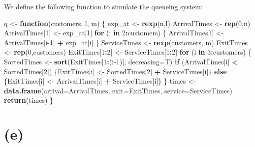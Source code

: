 \documentclass[]{article}
\newenvironment{Shaded}{\begin{snugshade}}{\end{snugshade}}
\newcommand{\ControlFlowTok}[1]{\textcolor[rgb]{0.13,0.29,0.53}{\textbf{#1}}}
\newcommand{\DataTypeTok}[1]{\textcolor[rgb]{0.13,0.29,0.53}{#1}}
\newcommand{\DecValTok}[1]{\textcolor[rgb]{0.00,0.00,0.81}{#1}}
\newcommand{\KeywordTok}[1]{\textcolor[rgb]{0.13,0.29,0.53}{\textbf{#1}}}
\newcommand{\NormalTok}[1]{#1}
\newcommand{\OperatorTok}[1]{\textcolor[rgb]{0.81,0.36,0.00}{\textbf{#1}}}
\newcommand{\StringTok}[1]{\textcolor[rgb]{0.31,0.60,0.02}{#1}}
\begin{document}
We define the following function to simulate the queueing system:

\begin{Shaded}
\begin{Highlighting}[]
\NormalTok{q <-}\StringTok{ }\ControlFlowTok{function}\NormalTok{(customers, l, m) \{}
\NormalTok{    exp_at <-}\StringTok{ }\KeywordTok{rexp}\NormalTok{(n,l)}
\NormalTok{    ArrivalTimes <-}\StringTok{ }\KeywordTok{rep}\NormalTok{(}\DecValTok{0}\NormalTok{,n)}
\NormalTok{    ArrivalTimes[}\DecValTok{1}\NormalTok{] <-}\StringTok{ }\NormalTok{exp_at[}\DecValTok{1}\NormalTok{]}
    \ControlFlowTok{for}\NormalTok{ (i }\ControlFlowTok{in} \DecValTok{2}\OperatorTok{:}\NormalTok{customers) \{}
\NormalTok{        ArrivalTimes[i] <-}\StringTok{ }\NormalTok{ArrivalTimes[i}\DecValTok{-1}\NormalTok{] }\OperatorTok{+}\StringTok{ }\NormalTok{exp_at[i]}
\NormalTok{    \} }
\NormalTok{    ServiceTimes <-}\StringTok{ }\KeywordTok{rexp}\NormalTok{(customers, m)}
\NormalTok{    ExitTimes <-}\StringTok{ }\KeywordTok{rep}\NormalTok{(}\DecValTok{0}\NormalTok{,customers)}
\NormalTok{    ExitTimes[}\DecValTok{1}\OperatorTok{:}\DecValTok{2}\NormalTok{] <-}\StringTok{ }\NormalTok{ServiceTimes[}\DecValTok{1}\OperatorTok{:}\DecValTok{2}\NormalTok{]}
    \ControlFlowTok{for}\NormalTok{ (i }\ControlFlowTok{in} \DecValTok{3}\OperatorTok{:}\NormalTok{customers) \{}
\NormalTok{        SortedTimes <-}\StringTok{ }\KeywordTok{sort}\NormalTok{(ExitTimes[}\DecValTok{1}\OperatorTok{:}\NormalTok{(i}\DecValTok{-1}\NormalTok{)], }\DataTypeTok{decreasing=}\NormalTok{T)}
        \ControlFlowTok{if}\NormalTok{ (ArrivalTimes[i] }\OperatorTok{<}\StringTok{ }\NormalTok{SortedTimes[}\DecValTok{2}\NormalTok{]) \{ExitTimes[i] <-}\StringTok{ }\NormalTok{SortedTimes[}\DecValTok{2}\NormalTok{] }\OperatorTok{+}\StringTok{ }\NormalTok{ServiceTimes[i]\}}
         \ControlFlowTok{else}\NormalTok{ \{ExitTimes[i] <-}\StringTok{ }\NormalTok{ArrivalTimes[i] }\OperatorTok{+}\StringTok{ }\NormalTok{ServiceTimes[i]\}}
\NormalTok{    \}}
\NormalTok{    times <-}\StringTok{ }\KeywordTok{data.frame}\NormalTok{(}\DataTypeTok{arrival=}\NormalTok{ArrivalTimes,}
                        \DataTypeTok{exit=}\NormalTok{ExitTimes,}
                        \DataTypeTok{service=}\NormalTok{ServiceTimes)}
    \KeywordTok{return}\NormalTok{(times)}
\NormalTok{\}}
\end{Highlighting}
\end{Shaded}

\hypertarget{e}{%
\section{(e)}\label{e}}
\end{document}
